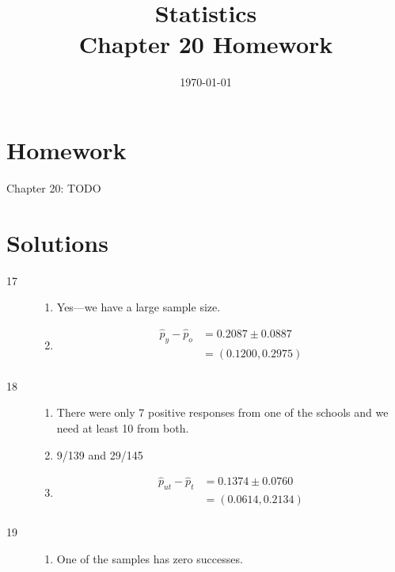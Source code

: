 \documentclass[letterpaper, landscape]{exam}
\title{Statistics \\ Chapter 20 Homework}
\date{\today}
\author{}
\begin{document}
  \maketitle

  \section{Homework}
  Chapter 20: TODO

  \ifprintanswers{}
    \section{Solutions}
    \begin{description}

      \item[17] 
        \begin{enumerate}[label = ({\alph*})]
          \item Yes---we have a large sample size.

          \item 
            \begin{align*}
              \hat{p}_{y} - \hat{p}_{o} & = 0.2087 \pm 0.0887 \\
                                        & = (0.1200, 0.2975) \\
            \end{align*}
        \end{enumerate}

      \item[18]
        \begin{enumerate}[label = ({\alph*})]
          \item There were only 7 positive responses from one of the schools and we
            need at least 10 from both.

          \item 9/139 and 29/145

          \item 
            \begin{align*}
              \hat{p}_{ut} - \hat{p}_{t} & = 0.1374 \pm 0.0760 \\
                                         & = (0.0614, 0.2134) \\
            \end{align*}
        \end{enumerate}

      \item[19]
        \begin{enumerate}[label = ({\alph*})]
          \item One of the samples has zero successes.


\end{enumerate}
\end{description}
\end{document}
